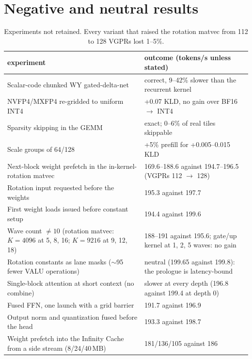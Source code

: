 \documentclass[10.5pt,a4paper]{article}
\begin{document}
\section{Negative and neutral results}
\label{sec:neg}

\begin{table}[H]
\centering\small
\begin{tabularx}{\linewidth}{@{}>{\raggedright\arraybackslash}p{6.0cm}X@{}}
\toprule
experiment & outcome (tokens/s unless stated)\\
\midrule
Scalar-code chunked WY gated-delta-net & correct, 9--42\% slower than the recurrent kernel\\
NVFP4/MXFP4 re-gridded to uniform INT4 & +0.07 KLD, no gain over BF16 $\to$ INT4\\
Sparsity skipping in the GEMM & exact; 0--6\% of real tiles skippable\\
Scale groups of 64/128 & +5\% prefill for +0.005--0.015 KLD\\
Next-block weight prefetch in the in-kernel-rotation matvec & 169.6--188.6 against 194.7--196.5 (VGPRs 112 $\to$ 128)\\
Rotation input requested before the weights & 195.3 against 197.7\\
First weight loads issued before constant setup & 194.4 against 199.6\\
Wave count $\ne10$ (rotation matvec: $K{=}4096$ at 5, 8, 16; $K{=}9216$ at 9, 12, 18) & 188--191 against 195.6; gate/up kernel at 1, 2, 5 waves: no gain\\
Rotation constants as lane masks ($\sim$95 fewer VALU operations) & neutral (199.65 against 199.8): the prologue is latency-bound\\
Single-block attention at short context (no combine) & slower at every depth (196.8 against 199.4 at depth 0)\\
Fused FFN, one launch with a grid barrier & 191.7 against 196.9\\
Output norm and quantization fused before the head & 193.3 against 198.7\\
Weight prefetch into the Infinity Cache from a side stream (8/24/40\,MB) & 181/136/105 against 186\\
\bottomrule
\end{tabularx}
\caption{Experiments not retained. Every variant that raised the rotation matvec from 112 to 128 VGPRs lost 1--5\%.}
\end{table}
\end{document}
